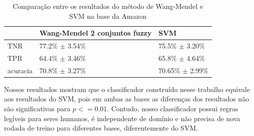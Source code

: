 \documentclass[template.tex]{subfiles}
\begin{document}
\begin{table}[!h]
    \begin{tabular}{lll}
    ~                       & Wang-Mendel 2 conjuntos fuzzy                             & SVM \\ \hline
    TNR                     & 77.2\% $\pm$ 3.54\%                                               & 75.5\% $\pm$ 3.20\%    \\
    TPR                 & 64.4\% $\pm$ 3.46\%                                               & 65.8\% $\pm$ 4.64\%   \\
    acuracia           & 70.8\% $\pm$ 3.27\%                                            & 70.65\% $\pm$ 2.99\%    \\
    \end{tabular}
    \caption{Comparação entre os resultados do método de Wang-Mendel e SVM na base da Amazon}
    \label{table:amazon_svm}
\end{table}

%
%
%

Nossos resultados mostram que o classificador construído nesse trabalho equivale aos resultados do SVM, pois em ambas as bases as diferenças dos resultados não são significativas para $p <= 0.01$. Contudo, nosso classificador possui regras legíveis para seres humanos, é independente de domínio e não precisa de nova rodada de treino para diferentes bases, diferentemente do SVM.

\end{document}
